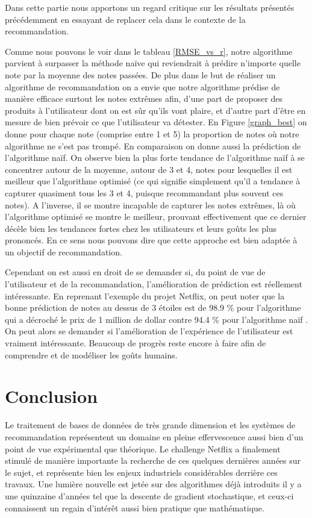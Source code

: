 \documentclass[10pt,a4paper]{article}
\begin{document}
Dans cette partie nous apportons un regard critique sur les résultats présentés précédemment en essayant de replacer cela dans le contexte de la recommandation. 

Comme nous pouvons le voir dans le tableau \ref{RMSE_vs_r}, notre algorithme parvient à surpasser la méthode naïve qui reviendrait à prédire n'importe quelle note par la moyenne des notes passées. De plus dans le but de réaliser un algorithme de recommandation on a envie que notre algorithme prédise de manière efficace surtout les notes extrêmes afin, d'une part de proposer des produits à l'utilisateur dont on est sûr qu'ils vont plaire, et d'autre part d'être en mesure de bien prévoir ce que l'utilisateur va détester. En Figure \ref{graph_best} on donne pour chaque note (comprise entre 1 et 5) la proportion de notes où notre algorithme ne s'est pas trompé. En comparaison on donne aussi la prédiction de l'algorithme naïf. On observe bien la plus forte tendance de l'algorithme naïf à se concentrer autour de la moyenne, autour de 3 et 4, notes pour lesquelles il est meilleur que l'algorithme optimisé (ce qui signifie simplement qu'il a tendance à capturer quasiment tous les 3 et 4, puisque recommandant plus souvent ces notes). A l'inverse, il se montre incapable de capturer les notes extrêmes, là où l'algorithme optimisé se montre le meilleur, prouvant effectivement que ce dernier décèle bien les tendances fortes chez les utilisateurs et leurs goûts les plus prononcés. En ce sens nous pouvons dire que cette approche est bien adaptée à un objectif de recommandation.

Cependant on est aussi en droit de se demander si, du point de vue de l'utilisateur et de la recommandation, l'amélioration de prédiction est réellement intéressante. En reprenant l'exemple du projet Netflix, on peut noter que la bonne prédiction de notes au dessus de 3 étoiles est de 98.9 $\%$ pour l'algorithme qui a décroché le prix de 1 million de dollar contre 94.4 $\%$ pour l'algorithme naïf \cite{blog}. On peut alors se demander si l'amélioration de l'expérience de l'utilisateur est vraiment intéressante. Beaucoup de progrès reste encore à faire afin de comprendre et de modéliser les goûts humains.

\section*{Conclusion}
Le traitement de bases de données de très grande dimension et les systèmes de recommandation représentent un domaine en pleine effervescence aussi bien d'un point de vue expérimental que théorique. Le challenge Netflix a finalement stimulé de manière importante la recherche de ces quelques dernières années sur le sujet, et représente bien les enjeux industriels considérables derrière ces travaux. Une lumière nouvelle est jetée sur des algorithmes déjà introduits il y a une quinzaine d'années tel que la descente de gradient stochastique, et ceux-ci connaissent un regain d'intérêt aussi bien pratique que mathématique.
\end{document}
